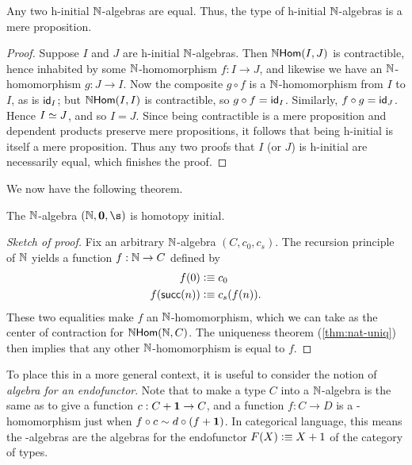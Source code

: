 \begin{thm}
  Any two h-initial $\nat$-algebras are equal.
  Thus, the type of h-initial $\nat$-algebras is a mere proposition.
\end{thm}
\begin{proof}
  Suppose $I$ and $J$ are h-initial $\nat$-algebras.
  Then $\nhom(I,J)$ is contractible, hence inhabited by some $\nat$-homomorphism $f:I\to J$, and likewise we have an $\nat$-homomorphism $g:J\to I$.
  Now the composite $g\circ f$ is a $\nat$-homomorphism from $I$ to $I$, as is $\idfunc[I]$; but $\nhom(I,I)$ is contractible, so $g\circ f = \idfunc[I]$.
  Similarly, $f\circ g = \idfunc[J]$.
  Hence $\eqv IJ$, and so $I=J$. Since being contractible is a mere proposition and dependent products preserve mere propositions, it follows that being h-initial is itself a mere proposition. Thus any two proofs that $I$ (or $J$) is h-initial are necessarily equal, which finishes the proof. 
\end{proof}

We now have the following theorem.

\begin{thm}\label{thm:nat-hinitial}
The $\nat$-algebra $(\nat, \zero, \s)$ is homotopy initial.
\end{thm}
\begin{proof}[Sketch of proof]
  Fix an arbitrary $\nat$-algebra $(C,c_0,c_s)$.
  The recursion principle of $\nat$ yields a function $f:\nat\to C$ defined by
  \begin{align*}
    f(0) &\defeq c_0\\
    f(\suc(n)) &\defeq c_s(f(n)).
  \end{align*}
  These two equalities make $f$ an $\nat$-homomorphism, which we can take as the center of contraction for $\nhom(\nat,C)$.
  The uniqueness theorem (\autoref{thm:nat-uniq}) then implies that any other $\nat$-homomorphism is equal to $f$.
\end{proof}

To place this in a more general context, it is useful to consider the notion of \emph{algebra for an endofunctor}.
Note that to make a type $C$ into a $\nat$-algebra is the same as to give a function $c:C+\unit\to C$, and a function $f:C\to D$ is a \nat-homomorphism just when $f \circ c \sim d \circ (f+\unit)$.
In categorical language, this means the \nat-algebras are the algebras for the endofunctor $F(X)\defeq X+1$ of the category of types.

